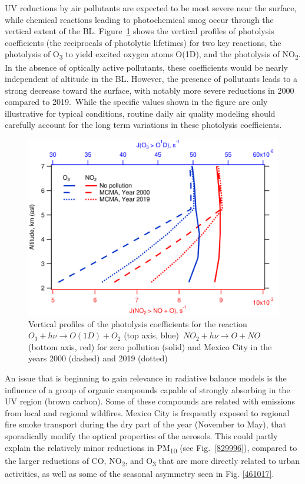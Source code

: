 \documentclass[journal=jacsat,manuscript=article]{achemso}
\begin{document}
UV reductions by air pollutants are expected to be most severe near the
surface, while chemical reactions leading to photochemical smog occur
through the vertical extent of the BL.
Figure~{\ref{973680}} shows the vertical profiles of
photolysis coefficients (the reciprocals of photolytic lifetimes) for
two key reactions, the photolysis of O\textsubscript{3} to yield excited
oxygen atoms O(1D), and the photolysis of NO\textsubscript{2}. In the
absence of optically active pollutants, these coefficients would be
nearly independent of altitude in the BL. However, the presence of
pollutants leads to a strong decrease toward the surface, with notably
more severe reductions in 2000 compared to 2019.~While the specific
values shown in the figure are only illustrative for typical conditions,
routine daily air quality modeling should carefully account for the long
term variations in these photolysis coefficients.


\begin{figure}[H]
  \begin{center}
    \includegraphics[width=0.70\columnwidth]{figures/jvals}
    \caption{{Vertical profiles of the photolysis coefficients for the
          reaction~\(O_3 + h\nu \rightarrow O(1D) + O_2\) (top axis, blue)~\(NO_2 + h\nu \rightarrow O+NO \) (bottom
          axis, red) for zero pollution (solid) and Mexico City in the years 2000
          (dashed) and 2019 (dotted)
          {\label{973680}}%
        }}
  \end{center}
\end{figure}

An issue that is beginning to gain relevance in radiative balance models
is the influence of a group of organic compounds capable of strongly
absorbing in the UV region (brown carbon).\citep{Laskin_2015} Some of
these compounds are related with emissions from local and regional
wildfires.\citep{Gadhavi_2010} Mexico City is frequently exposed to
regional fire smoke transport during the dry part of the year (November
to May)\citep{Rios_2019}, that sporadically modify the optical
properties of the aerosols.\citep{Barnard_2008} This could partly explain
the relatively minor reductions in PM\textsubscript{10} (see
Fig.~{\ref{829996}}), compared to the larger reductions
of CO, NO\textsubscript{2}, and O\textsubscript{3} that are more
directly related to urban activities, as well as some of the seasonal
asymmetry seen in Fig. {\ref{461017}}. ~
\end{document}
